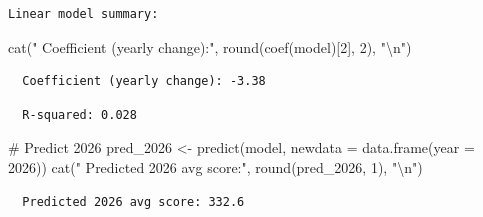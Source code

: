 \documentclass[
  11pt,
  a4paper,
  DIV=11,
  numbers=noendperiod]{scrartcl}
\newenvironment{Shaded}{\begin{snugshade}}{\end{snugshade}}
\newcommand{\AttributeTok}[1]{\textcolor[rgb]{0.40,0.45,0.13}{#1}}
\newcommand{\CommentTok}[1]{\textcolor[rgb]{0.37,0.37,0.37}{#1}}
\newcommand{\DecValTok}[1]{\textcolor[rgb]{0.68,0.00,0.00}{#1}}
\newcommand{\FunctionTok}[1]{\textcolor[rgb]{0.28,0.35,0.67}{#1}}
\newcommand{\NormalTok}[1]{\textcolor[rgb]{0.00,0.23,0.31}{#1}}
\newcommand{\OtherTok}[1]{\textcolor[rgb]{0.00,0.23,0.31}{#1}}
\newcommand{\SpecialCharTok}[1]{\textcolor[rgb]{0.37,0.37,0.37}{#1}}
\newcommand{\StringTok}[1]{\textcolor[rgb]{0.13,0.47,0.30}{#1}}
\begin{document}
\begin{verbatim}
Linear model summary:
\end{verbatim}

\begin{Shaded}
\begin{Highlighting}[]
\FunctionTok{cat}\NormalTok{(}\StringTok{"  Coefficient (yearly change):"}\NormalTok{, }\FunctionTok{round}\NormalTok{(}\FunctionTok{coef}\NormalTok{(model)[}\DecValTok{2}\NormalTok{], }\DecValTok{2}\NormalTok{), }\StringTok{"}\SpecialCharTok{\textbackslash{}n}\StringTok{"}\NormalTok{)}
\end{Highlighting}
\end{Shaded}

\begin{verbatim}
  Coefficient (yearly change): -3.38 
\end{verbatim}

\begin{Shaded}
\end{Shaded}

\begin{verbatim}
  R-squared: 0.028 
\end{verbatim}

\begin{Shaded}
\begin{Highlighting}[]
\CommentTok{\# Predict 2026}
\NormalTok{pred\_2026 }\OtherTok{\textless{}{-}} \FunctionTok{predict}\NormalTok{(model, }\AttributeTok{newdata =} \FunctionTok{data.frame}\NormalTok{(}\AttributeTok{year =} \DecValTok{2026}\NormalTok{))}
\FunctionTok{cat}\NormalTok{(}\StringTok{"  Predicted 2026 avg score:"}\NormalTok{, }\FunctionTok{round}\NormalTok{(pred\_2026, }\DecValTok{1}\NormalTok{), }\StringTok{"}\SpecialCharTok{\textbackslash{}n}\StringTok{"}\NormalTok{)}
\end{Highlighting}
\end{Shaded}

\begin{verbatim}
  Predicted 2026 avg score: 332.6 
\end{verbatim}
\end{document}
